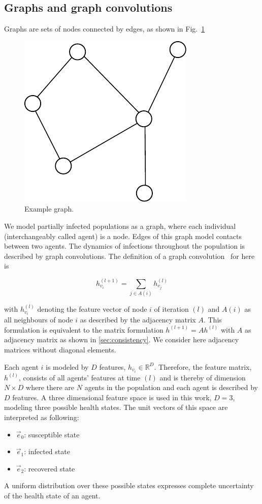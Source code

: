 \subsection{Graphs and graph convolutions}

Graphs are sets of nodes connected by edges, as shown in Fig.~\ref{fig:graph_example}

\begin{figure}[H]
	\centering
	\includegraphics[width=0.4\columnwidth]{img/graph_example.pdf}
	\caption{Example graph.}
	\label{fig:graph_example}
\end{figure}

We model partially infected populations as a graph, where each individual (interchangeably called agent) is a node. Edges of this graph model contacts between two agents. The dynamics of infections throughout the population is described by graph convolutions. The definition of a graph convolution~\cite{Kipf2017SemiSupervisedCW} for here is

\begin{equation}
	\label{eq:graph_convolution}
	h_{v_i}^{(l+1)} = \sum_{j\in A(i)} h_{v_j}^{(l)}
\end{equation}

with $h_{v_i}^{(l)}$ denoting the feature vector of node $i$ of iteration $(l)$ and $A(i)$ as all neighbours of node $i$ as described by the adjacency matrix $A$. This formulation is equivalent to the matrix formulation $h^{(l+1)} = A h^{(l)}$ with $A$ as adjacency matrix as shown in \ref{sec:consistency}. We consider here adjacency matrices without diagonal elements.

Each agent $i$ is modeled by $D$ features, $h_{v_i} \in \mathbb{R}^D$. Therefore, the feature matrix, $h^{(l)}$, consists of all agents' features at time $(l)$ and is thereby of dimension $N\times D$ where there are $N$ agents in the population and each agent is described by $D$ features. A three dimensional feature space is used in this work, $D=3$, modeling three possible health states. The unit vectors of this space are interpreted as following:
\begin{itemize}
	\item $\vec{e}_0$: susceptible state
	\item $\vec{e}_1$: infected state
	\item $\vec{e}_2$: recovered state
\end{itemize}
A uniform distribution over these possible states expresses complete uncertainty of the health state of an agent.

